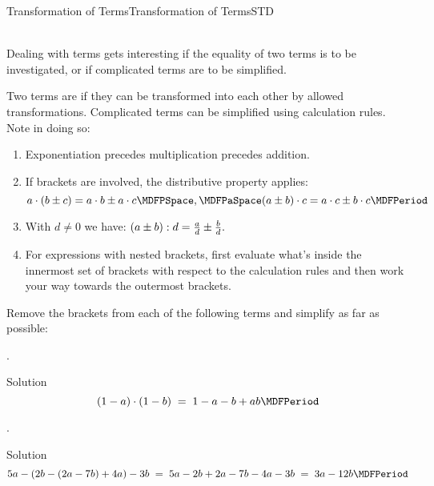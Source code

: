 \begin{MXContent}{Transformation of Terms}{Transformation of Terms}{STD}

\ \\
Dealing with terms gets interesting if the equality of two terms is to be investigated, or if complicated terms are to
be simplified.

\begin{MInfo}
Two terms are  if they can be transformed into each other by allowed transformations. 
Complicated terms can be simplified using calculation rules. Note in doing so:
\begin{enumerate}
\item Exponentiation precedes multiplication precedes addition.
\item If brackets are involved, the distributive property applies:
$$a\cdot(b\pm c) = a\cdot b\pm a\cdot c \MDFPSpace, \MDFPaSpace (a\pm b)\cdot c = a\cdot c \pm b\cdot c \MDFPeriod$$
\item With $d\neq 0$ we have: $\displaystyle (a\pm b):d = \tfrac{a}{d}\pm \tfrac{b}{d}.$
\item For expressions with nested brackets, first evaluate what's inside the innermost
  set of brackets with respect to the calculation rules and then work your way towards the outermost brackets.
\end{enumerate}
\end{MInfo}

\begin{MExercise}
Remove the brackets from each of the following terms and simplify as far as possible:
\begin{MExerciseItems}
\item{. \begin{MHint}{Solution}$$(1-a)\cdot(1-b)\;=\; 1-a-b+a b \MDFPeriod $$\end{MHint}}
\item{. \begin{MHint}{Solution}$$5a-(2b-(2a-7b)+4a)-3b \; = \; 5a-2b+2a-7b-4a-3b \;=\; 3a-12b \MDFPeriod  $$\end{MHint}}
\end{MExerciseItems}
\end{MExercise}


\end{MXContent}
